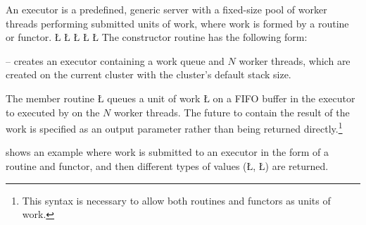 \documentclass[openright,twoside]{report}
\begin{document}
An executor is a predefined, generic server with a fixed-size pool of worker threads performing submitted units of work, where work is formed by a routine or functor.
\LGinlinefalse\LGbegin\lgrinde
\L{}
\L{}
\L{\LB{}}
\L{\LB{}}
\L{\LB{\};}}
\endlgrinde\LGend
The constructor routine has the following form:
\begin{prefix}
\item[\LGinlinetrue\LGbegin\lgrinde\L{\LB{\V{uExecutor}(\0\K{unsigned}\0\K{int}\0\V{nworkers}\0=\04\0)}}\endlgrinde\LGend{}]
\label{p:uBaseCoroutine1}
-- creates an executor containing a work queue and $N$ worker threads, which are created on the current cluster with the cluster's default stack size.
\end{prefix}

The member routine \LGinlinetrue\LGbegin\lgrinde\L{}\endlgrinde\LGend{} queues a unit of work \LGinlinetrue\LGbegin\lgrinde\L{}\endlgrinde\LGend{} on a FIFO buffer in the executor to executed by on the $N$ worker threads.
The future to contain the result of the work is specified as an output parameter rather than being returned directly.\footnote{
This syntax is necessary to allow both routines and functors as units of work.}

 shows an example where work is submitted to an executor in the form of a routine and functor, and then different types of values (\LGinlinetrue\LGbegin\lgrinde\L{}\endlgrinde\LGend{}, \LGinlinetrue\LGbegin\lgrinde\L{}\endlgrinde\LGend{}) are returned.
\end{document}
